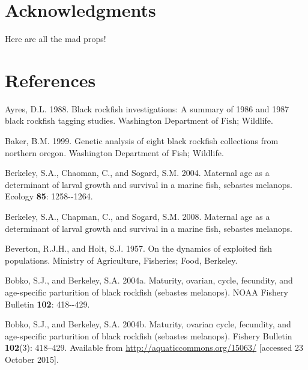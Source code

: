 \documentclass[11pt,
  english,
  letterpaper,
]{article}
\newlength{\cslhangindent}
\newenvironment{CSLReferences}[2] %
 {%
  \setlength{\parindent}{0pt}
  \ifodd #1 \everypar{\setlength{\hangindent}{\cslhangindent}}\ignorespaces\fi
  \ifnum #2 > 0
  \setlength{\parskip}{#2\baselineskip}
  \fi
 }%
 {}
\begin{document}
\hypertarget{acknowledgments}{%
\section{Acknowledgments}\label{acknowledgments}}

Here are all the mad props!

\clearpage

\hypertarget{references}{%
\section{References}\label{references}}

\hypertarget{refs}{}
\begin{CSLReferences}{1}{0}
\leavevmode{}%
Ayres, D.L. 1988. Black rockfish investigations: A summary of 1986 and 1987 black rockfish tagging studies. Washington Department of Fish; Wildlife.

\leavevmode{}%
Baker, B.M. 1999. Genetic analysis of eight black rockfish collections from northern oregon. Washington Department of Fish; Wildlife.

\leavevmode{}%
Berkeley, S.A., Chaoman, C., and Sogard, S.M. 2004. Maternal age as a determinant of larval growth and survival in a marine fish, sebastes melanops. Ecology \textbf{85}: 1258-\/-1264.

\leavevmode{}%
Berkeley, S.A., Chapman, C., and Sogard, S.M. 2008. Maternal age as a determinant of larval growth and survival in a marine fish, sebastes melanops.

\leavevmode{}%
Beverton, R.J.H., and Holt, S.J. 1957. On the dynamics of exploited fish populations. Ministry of Agriculture, Fisheries; Food, Berkeley.

\leavevmode{}%
Bobko, S.J., and Berkeley, S.A. 2004a. Maturity, ovarian, cycle, fecundity, and age-specific parturition of black rockfish (sebastes melanops). NOAA Fishery Bulletin \textbf{102}: 418-\/-429.

\leavevmode{}%
Bobko, S.J., and Berkeley, S.A. 2004b. Maturity, ovarian cycle, fecundity, and age-specific parturition of black rockfish (sebastes melanops). Fishery Bulletin \textbf{102}(3): 418--429. Available from \url{http://aquaticcommons.org/15063/} {[}accessed 23 October 2015{]}.


\end{CSLReferences}
\end{document}
